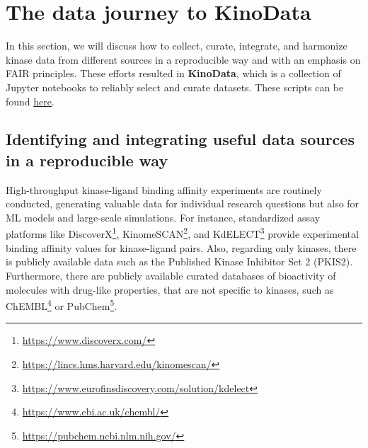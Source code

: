 \documentclass[9pt,lessons]{livecoms}
\begin{document}
\section{The data journey to KinoData}
In this section, we will discuss how to collect, curate, integrate, and harmonize kinase data from different sources in a reproducible way and with an emphasis on FAIR principles. \cite{wilkinson_2016_scientificdata} These efforts resulted in \textbf{KinoData}, which is a collection of Jupyter notebooks to reliably select and curate datasets. These scripts can be found \href{https://github.com/openkinome/kinodata}{here}.

\subsection{Identifying and integrating useful data sources in a reproducible way}

High-throughput kinase-ligand binding affinity experiments are routinely conducted, generating valuable data for individual research questions but also for ML models and large-scale simulations.
For instance, standardized assay platforms like DiscoverX\footnote{\href{https://www.discoverx.com/}{https://www.discoverx.com/}}, KinomeSCAN\footnote{\href{https://lincs.hms.harvard.edu/kinomescan/}{https://lincs.hms.harvard.edu/kinomescan/}}, and KdELECT\footnote{\href{https://www.eurofinsdiscovery.com/solution/kdelect}{https://www.eurofinsdiscovery.com/solution/kdelect}} provide experimental binding affinity values for kinase-ligand pairs. Also, regarding only kinases, there is publicly available data such as the Published Kinase Inhibitor Set 2 (PKIS2). \cite{drewry2017progress} 
Furthermore, there are publicly available curated databases of bioactivity of molecules with drug-like properties, that are not specific to kinases, such as ChEMBL\footnote{\href{https://www.ebi.ac.uk/chembl/}{https://www.ebi.ac.uk/chembl/}}\cite{zdrazil2023chembl} or PubChem\footnote{\href{https://pubchem.ncbi.nlm.nih.gov/}{https://pubchem.ncbi.nlm.nih.gov/}}.
\end{document}

